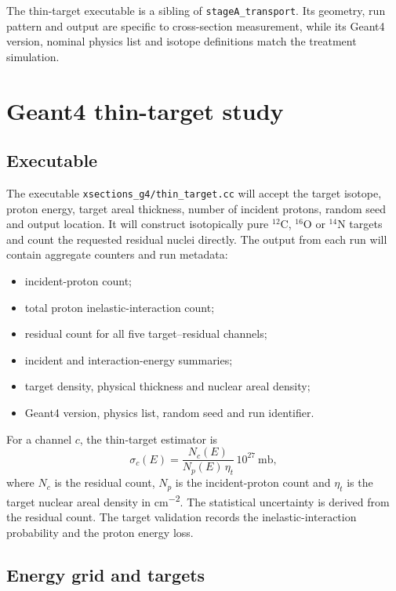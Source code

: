 \documentclass[11pt]{article}
\newcommand{\file}[1]{\texttt{#1}}
\newcommand{\Ox}[1]{{}^{#1}\mathrm{O}}
\newcommand{\Cl}[1]{{}^{#1}\mathrm{C}}
\newcommand{\Ni}[1]{{}^{#1}\mathrm{N}}
\begin{document}
The thin-target executable is a sibling of \file{stageA\_transport}.  Its
geometry, run pattern and output are specific to cross-section measurement,
while its Geant4 version, nominal physics list and isotope definitions match
the treatment simulation.

\section{Geant4 thin-target study}

\subsection{Executable}

The executable \file{xsections\_g4/thin\_target.cc} will accept the target
isotope, proton energy, target areal thickness, number of incident protons,
random seed and output location.  It will construct isotopically pure
$\Cl{12}$, $\Ox{16}$ or $\Ni{14}$ targets and count the requested residual
nuclei directly.  The output from each run will contain aggregate counters and
run metadata:
\begin{itemize}[nosep]
  \item incident-proton count;
  \item total proton inelastic-interaction count;
  \item residual count for all five target--residual channels;
  \item incident and interaction-energy summaries;
  \item target density, physical thickness and nuclear areal density;
  \item Geant4 version, physics list, random seed and run identifier.
\end{itemize}

For a channel $c$, the thin-target estimator is
\begin{equation}
  \sigma_c(E) =
  \frac{N_c(E)}{N_p(E)\,\eta_t}\,10^{27}\ \mathrm{mb},
\end{equation}
where $N_c$ is the residual count, $N_p$ is the incident-proton count and
$\eta_t$ is the target nuclear areal density in \si{cm^{-2}}.  The statistical
uncertainty is derived from the residual count.  The target validation records
the inelastic-interaction probability and the proton energy loss.

\subsection{Energy grid and targets}
\end{document}
